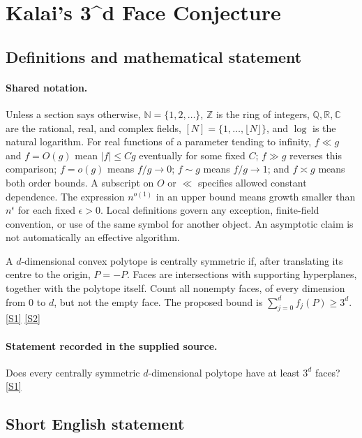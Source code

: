 \documentclass[11pt,a4paper]{article}
\newcommand{\N}{\mathbb{N}}
\newcommand{\Z}{\mathbb{Z}}
\newcommand{\Q}{\mathbb{Q}}
\newcommand{\R}{\mathbb{R}}
\newcommand{\C}{\mathbb{C}}
\newcommand{\sref}[2]{\hyperlink{source:#1:#2}{[S#2]}}
\begin{document}
\section{Kalai's 3\textasciicircum{}d Face Conjecture}\label{statement}


\subsection{Definitions and mathematical statement}

\paragraph{Shared notation.}Unless a section says otherwise, $\N=\{1,2,\ldots\}$,
$\Z$ is the ring of integers, $\Q,\R,\C$ are the rational, real, and complex
fields, $[N]=\{1,\ldots,\lfloor N\rfloor\}$, and $\log$ is the natural
logarithm. For real functions of a parameter tending to infinity,
$f\ll g$ and $f=O(g)$ mean $|f|\leq Cg$ eventually for some fixed $C$;
$f\gg g$ reverses this comparison; $f=o(g)$ means $f/g\to0$;
$f\sim g$ means $f/g\to1$; and $f\asymp g$ means both order bounds.
A subscript on $O$ or $\ll$ specifies allowed constant dependence.
The expression $n^{o(1)}$ in an upper bound means growth smaller than
$n^\epsilon$ for each fixed $\epsilon>0$. Local definitions govern any
exception, finite-field convention, or use of the same symbol for another
object. An asymptotic claim is not automatically an effective algorithm.



A $d$-dimensional convex polytope is centrally symmetric if, after translating its centre to the origin, $P=-P$. Faces are intersections with supporting hyperplanes, together with the polytope itself. Count all nonempty faces, of every dimension from 0 to $d$, but not the empty face. The proposed bound is $\sum_{j=0}^{d}f_j(P)\geq3^d$. \sref{statement}{1} \sref{statement}{2}

\paragraph{Statement recorded in the supplied source.}
Does every centrally symmetric $d$-dimensional polytope have at least $3^d$ faces? \sref{statement}{1}

\subsection{Short English statement}
\end{document}
